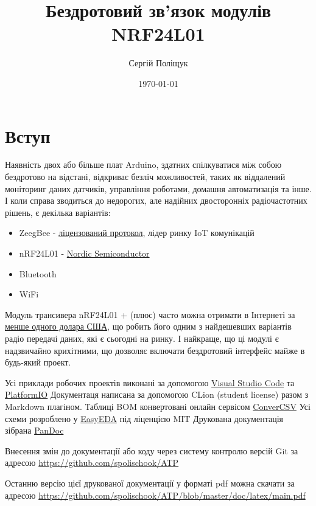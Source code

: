 \documentclass[14pt,a4paper]{extarticle}
\title{Бездротовий зв'язок модулів NRF24L01}
\author{Сергій Поліщук}
\date{\today}
\begin{document}
\maketitle
\tableofcontents
\clearpage
\section{Вступ}
Наявність двох або більше плат Arduino, здатних спілкуватися між собою
бездротово на відстані, відкриває безліч можливостей, таких як
віддалений моніторинг даних датчиків, управління роботами, домашня
автоматизація та інше. І коли справа зводиться до недорогих, але
надійних двосторонніх радіочастотних рішень, є декілька варіантів:
\begin{itemize}
\item ZeegBee -
\href{https://web.archive.org/web/20100216234546/http://freaklabs.org/index.php/Blog/Zigbee/Zigbee-Linux-and-the-GPL.html}{ліцензований
протокол}, лідер ринку IoT комунікацій
\item nRF24L01 -
\href{https://www.nordicsemi.com/Products/Low-power-short-range-wireless/nRF24-series}{Nordic
Semiconductor}
\item Bluetooth
\item WiFi
\end{itemize}

Модуль трансивера nRF24L01 + (плюс) часто можна отримати в Інтернеті за
\href{https://ru.aliexpress.com/wholesale?SearchText=nrf24l01}{менше
одного долара США}, що робить його одним з найдешевших варіантів радіо
передачі даних, які є сьогодні на ринку. І найкраще, що ці модулі є
надзвичайно крихітними, що дозволяє включати бездротовий інтерфейс майже
в будь-який проект.

Усі приклади робочих проектів виконані за допомогою
\href{https://code.visualstudio.com/}{Visual Studio Code}
та \href{https://platformio.org/}{PlatformIO}  
Документаця написана за допомогою CLion (student license)
разом з Markdown плагіном.  
Таблиці BOM конвертовані онлайн сервісом \href{https://www.convertcsv.com/csv-to-markdown.htm}{ConverCSV}  
Усі схеми розроблено у \href{https://easyeda.com/}{EasyEDA} під ліценцією MIT  
Друкована документація зібрана \href{https://pandoc.org/}{PanDoc}

Внесення змін до документації або коду через систему контролю
версій Git за адресою
\href{https://github.com/spolischook/ATP}{https://github.com/spolischook/ATP}

Останню версію цієї друкованої документації у форматі pdf можна скачати за адресою 
\href{https://github.com/spolischook/ATP/blob/master/doc/latex/main.pdf}{https://github.com/spolischook/ATP/blob/master/doc/latex/main.pdf}
\end{document}
